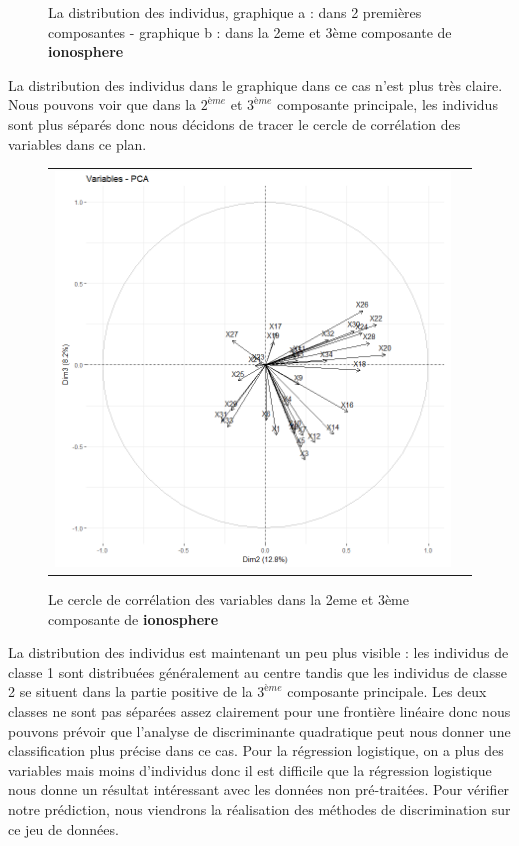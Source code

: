 \documentclass[a4paper,11pt,oneside,roman]{article}
\begin{document}
\begin{figure}[htb]
\begin{tabular}{cc}
    \end{tabular}
    \caption{La distribution des individus, graphique a : dans 2 premières composantes - graphique b : dans la 2eme et 3ème composante de \textbf{ionosphere}}
    \label{fig:my_label}
\end{figure}
La distribution des individus dans le graphique dans ce cas n'est plus très claire. Nous pouvons voir que dans la $2^{ème}$ et $3^{ème}$ composante principale, les individus sont plus séparés donc nous décidons de tracer le cercle de corrélation des variables dans ce plan.
\begin{figure}[htb]
    \centering
    \begin{tabular}{cc}
    \includegraphics[scale = .3]{./discrimination/ionosphere/varplot23.png} 
    \end{tabular}
    \caption{Le cercle de corrélation des variables dans la 2eme et 3ème composante de \textbf{ionosphere}}
    \label{fig:my_label}
\end{figure}
La distribution des individus est maintenant un peu plus visible : les individus de classe 1 sont distribuées généralement au centre tandis que les individus de classe 2 se situent dans la partie positive de la $3^{ème}$ composante principale. Les deux classes ne sont pas séparées assez clairement pour une frontière linéaire donc nous pouvons prévoir que l'analyse de discriminante quadratique peut nous donner une classification plus précise dans ce cas. Pour la régression logistique, on a plus des variables mais moins d'individus donc il est difficile que la régression logistique nous donne un résultat intéressant avec les données non pré-traitées.  Pour vérifier notre prédiction, nous viendrons la réalisation des méthodes de discrimination sur ce jeu de données.
\end{document}
